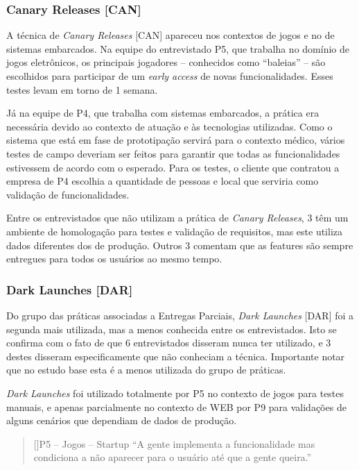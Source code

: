 \subsubsection{Canary Releases [CAN]}

A técnica de \emph{Canary Releases} [CAN] apareceu nos contextos de jogos e no de sistemas embarcados. Na equipe do entrevistado P5, que trabalha no domínio de jogos eletrônicos, os principais jogadores -- conhecidos como ``baleias'' -- são escolhidos para participar de um \emph{early access} de novas funcionalidades.  Esses testes levam em torno de 1 semana. 

Já na equipe de P4, que trabalha com sistemas embarcados, a prática era necessária devido ao contexto de atuação e às tecnologias utilizadas. Como o sistema que está em fase de prototipação servirá para o contexto médico, vários testes de campo deveriam ser feitos para garantir que todas as funcionalidades estivessem de acordo com o esperado. Para os testes, o cliente que contratou a empresa de P4 escolhia a quantidade de pessoas e local que serviria como validação de funcionalidades.

Entre os entrevistados que não utilizam a prática de \emph{Canary Releases}, 3 têm um ambiente de homologação para testes e validação de requisitos, mas este utiliza dados diferentes dos de produção. Outros 3 comentam que as features são sempre entregues para todos os usuários ao mesmo tempo.


\subsubsection{Dark Launches [DAR]}

Do grupo das práticas associadas a Entregas Parciais, \emph{Dark Launches} [DAR] foi a segunda mais utilizada, mas a menos conhecida entre os entrevistados. Isto se confirma com o fato de que 6 entrevistados disseram nunca ter utilizado, e 3 destes disseram especificamente que não conheciam a técnica. Importante notar que no estudo base \cite{empiricalStudy2016} esta é a menos utilizada do grupo de práticas.

\emph{Dark Launches} foi utilizado totalmente por P5 no contexto de jogos para testes manuais, e apenas parcialmente no contexto de WEB por P9 para validações de alguns cenários que dependiam de dados de produção.


\begin{quotation}[]{P5 -- Jogos -- Startup}
    ``A gente implementa a funcionalidade mas condiciona a não aparecer para o usuário até que a gente queira.''
\end{quotation}

